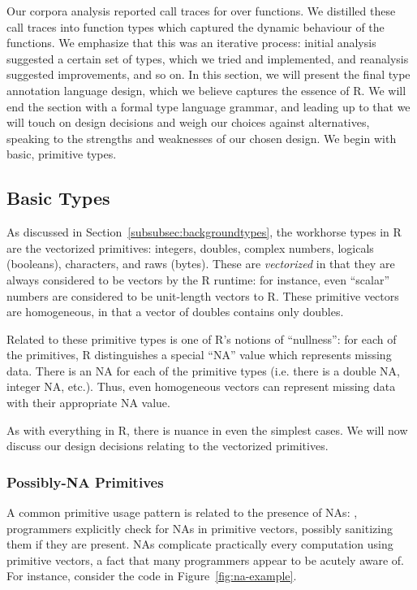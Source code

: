 \documentclass[acmsmall,review,anonymous]{acmart}\settopmatter{printfolios=true,printccs=false,printacmref=false}
\begin{document}
Our corpora analysis reported  call traces for over 
functions.  We distilled these call traces into function types which
captured the dynamic behaviour of the functions.  We emphasize that this was
an iterative process: initial analysis suggested a certain set of types,
which we tried and implemented, and reanalysis suggested improvements,
and so on.  In this section, we will present the final type annotation language design, 
which we believe captures the essence of R.  We will end the section with a formal type 
language grammar, and leading up to that we will
touch on design decisions and weigh our choices against alternatives,
speaking to the strengths and weaknesses of our chosen design.
We begin with basic, primitive types.

%
%
%
%
\subsection{Basic Types}
\label{subsec:basictypes}

As discussed in Section~\ref{subsubsec:backgroundtypes}, the workhorse types
in R are the vectorized primitives: integers, doubles, complex numbers,
logicals (booleans), characters, and raws (bytes).  These are {\it
  vectorized} in that they are always considered to be vectors by the R
runtime: for instance, even ``scalar'' numbers are considered to be
unit-length vectors to R.  These primitive vectors are homogeneous, in that
a vector of doubles contains only doubles.

Related to these primitive types is one of R's notions of ``nullness'': for
each of the primitives, R distinguishes a special ``NA'' value which
represents missing data.  There is an NA for each of the primitive types
(i.e. there is a double NA, integer NA, etc.).  Thus, even homogeneous
vectors can represent missing data with their appropriate NA value.

As with everything in R, there is nuance in even the simplest cases.
We will now discuss our design decisions relating to the vectorized primitives.

%
%
\subsubsection{Possibly-NA Primitives}

A common primitive usage pattern is related to the presence of NAs:
, programmers explicitly check for NAs in primitive vectors,
possibly sanitizing them if they are present.  NAs complicate practically every computation
using primitive vectors, a fact that many programmers appear to be acutely
aware of. For instance, consider the code in Figure~\ref{fig:na-example}.
\end{document}
